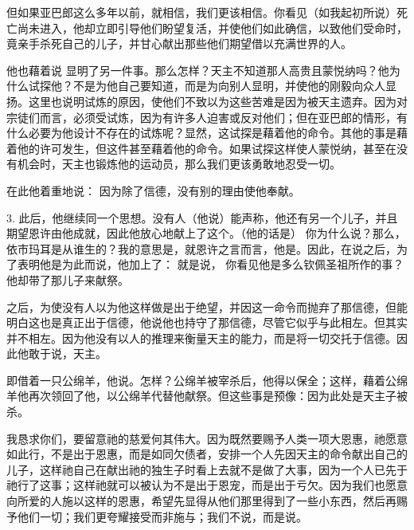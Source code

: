 但如果亚巴郎这么多年以前，就相信，我们更该相信。你看见（如我起初所说）死亡尚未进入，他却立即引导他们盼望复活，并使他们如此确信，以致他们受命时，竟亲手杀死自己的儿子，并甘心献出那些他们期望借以充满世界的人。\par

他也藉着说  显明了另一件事。那么怎样？天主不知道那人高贵且蒙悦纳吗？他为什么试探他？不是为他自己要知道，而是为向别人显明，并使他的刚毅向众人显扬。这里也说明试炼的原因，使他们不致以为这些苦难是因为被天主遗弃。因为对宗徒们而言，必须受试炼，因为有许多人迫害或反对他们；但在亚巴郎的情形，有什么必要为他设计不存在的试炼呢？显然，这试探是藉着他的命令。其他的事是藉着他的许可发生，但这件甚至藉着他的命令。如果试探这样使人蒙悦纳，甚至在没有机会时，天主也锻炼他的运动员，那么我们更该勇敢地忍受一切。\par

在此他着重地说： 因为除了信德，没有别的理由使他奉献。\par

3. 此后，他继续同一个思想。没有人（他说）能声称，他还有另一个儿子，并且期望恩许由他成就，因此他放心地献上了这个。（他的话是） 你为什么说？那么，依市玛耳是从谁生的？我的意思是，就恩许之言而言，他是。因此，在说之后，为了表明他是为此而说，他加上了： 就是说， 你看见他是多么钦佩圣祖所作的事？ 他却带了那儿子来献祭。\par

之后，为使没有人以为他这样做是出于绝望，并因这一命令而抛弃了那信德，但能明白这也是真正出于信德，他说他也持守了那信德，尽管它似乎与此相左。但其实并不相左。因为他没有以人的推理来衡量天主的能力，而是将一切交托于信德。因此他敢于说，天主。\par

即借着一只公绵羊，他说。怎样？公绵羊被宰杀后，他得以保全；这样，藉着公绵羊他再次领回了他，以公绵羊代替他献祭。但这些事是预像：因为此处是天主子被杀。\par

我恳求你们，要留意祂的慈爱何其伟大。因为既然要赐予人类一项大恩惠，祂愿意如此行，不是出于恩惠，而是如同欠债者，安排一个人先因天主的命令献出自己的儿子，这样祂自己在献出祂的独生子时看上去就不是做了大事，因为一个人已先于祂行了这事；这样祂就可以被认为不是出于恩宠，而是出于亏欠。因为我们也愿意向所爱的人施以这样的恩惠，希望先显得从他们那里得到了一些小东西，然后再赐予他们一切；我们更夸耀接受而非施与；我们不说，而是说。\par

